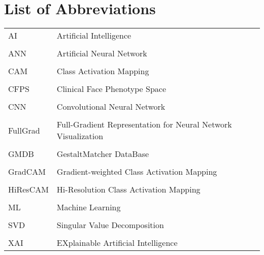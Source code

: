 \documentclass[../report.tex]{subfiles}
\begin{document}
    \chapter{List of Abbreviations}
\begin{table}[H]
	\begin{tabular}{ll}
		AI       & Artificial Intelligence                                       \\
		&                                                               \\
		ANN      & Artificial Neural Network                                     \\
		&                                                               \\
		CAM      & Class Activation Mapping                                      \\
		&                                                               \\
		CFPS     & Clinical Face Phenotype Space                                 \\
		&                                                               \\
		CNN      & Convolutional Neural Network                                  \\
		&                                                               \\
		FullGrad & Full-Gradient Representation for Neural Network Visualization \\
		&                                                               \\
		GMDB     & GestaltMatcher DataBase                                       \\
		&                                                               \\
		GradCAM  & Gradient-weighted  Class Activation Mapping                   \\
		&                                                               \\
		HiResCAM & Hi-Resolution Class Activation Mapping                        \\
		&                                                               \\
		ML       & Machine Learning                                              \\
		&                                                               \\
		SVD      & Singular Value Decomposition                                  \\
		&                                                               \\
		XAI      & EXplainable Artificial Intelligence                          
	\end{tabular}
\end{table}
\end{document}
